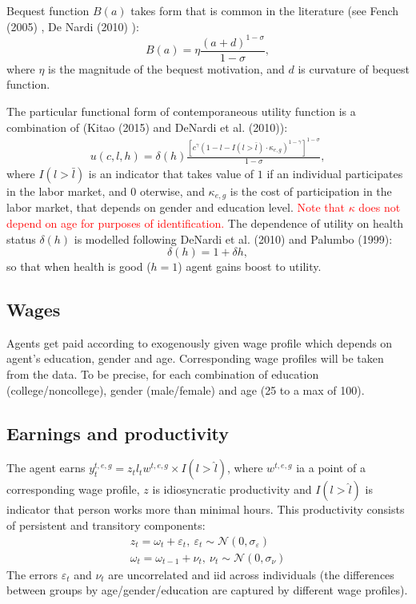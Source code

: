 \documentclass[
10pt, %
a4paper, %
oneside, %
headinclude,footinclude, %
BCOR5mm, %
]{scrartcl}
\begin{document}
Bequest function $B(a)$ takes form that is common in the literature (see Fench (2005) \cite{French2005}, De Nardi (2010) \cite{DeNardi2010}):
\begin{equation}
B(a) = \eta\frac{(a+d)^{1-\sigma}}{1-\sigma},
\end{equation}
where $\eta$ is the magnitude of the bequest motivation, and $d$ is curvature of bequest function.

The particular functional form of contemporaneous utility function  is a combination of (Kitao (2015)\cite{Kitao2015} and DeNardi et al. (2010)\cite{DeNardi2010}):
\begin{eqnarray*}
u(c,l,h) = \delta(h)\frac{[c^{\gamma}(1-l-I(l>\bar{l})\cdot \kappa_{e,g})^{1-\gamma}]^{1-\sigma}}{1-\sigma},
\end{eqnarray*}
where $I(l>\bar{l})$ is an indicator that takes value of $1$ if an individual participates in the labor market, and $0$ oterwise, and $\kappa_{e,g}$ is the cost of participation in the labor market, that depends on gender and education level. \textcolor{red}{Note that $\kappa$ does not depend on age for purposes of identification.} The dependence of utility on health status  $\delta(h)$ is modelled following DeNardi et al. (2010)\cite{DeNardi2010} and Palumbo (1999)\cite{Palumbo1999}:
\begin{equation*}
\delta(h) = 1+\delta h,
\end{equation*}
so that when health is good ($h=1$) agent gains boost to utility.


\subsection{Wages}
Agents get paid according to exogenously given wage profile which depends on agent's education, gender and age. Corresponding wage profiles will be taken from the data. To be precise, for each combination of education (college/noncollege), gender (male/female) and age (25 to a max of 100).

\subsection{Earnings and productivity}
The agent earns $y_t^{t,e,g} = z_t l_t w^{t,e,g}\times I(l>\hat{l})$, where $w^{t,e,g}$ ia a point of a corresponding wage profile, $z$ is idiosyncratic productivity and $I(l>\hat{l})$ is indicator that person works more than minimal hours. This productivity consists of persistent and transitory components: 
\begin{eqnarray*}
z_t = \omega_t + \varepsilon_t, \ \varepsilon_t\sim \mathcal{N}(0,\sigma_{\varepsilon})  \\
\omega_t = \omega_{t-1} +\nu_t, \ \nu_t\sim\mathcal{N}(0,\sigma_{\nu})
\end{eqnarray*}
The errors $\varepsilon_t$ and $\nu_t$ are uncorrelated and iid across individuals (the differences between groups by age/gender/education are captured by different wage profiles).
\end{document}
